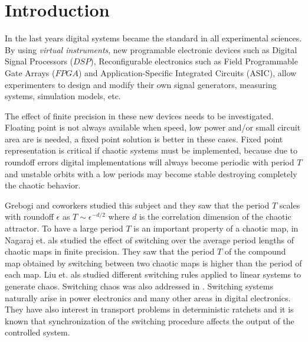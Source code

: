 \section{Introduction} \label{sec:intro}

In the last years digital systems became the standard in all experimental sciences.
By using \textit{virtual instruments}, new programable electronic devices such as Digital Signal Processors ($DSP$), Reconfigurable electronics such as Field Programmable Gate Arrays ($FPGA$) and Application-Specific Integrated Circuits (ASIC), allow experimenters to design and modify their own signal generators, measuring systems, simulation models, etc.

The effect of finite precision in these new devices needs to be investigated.
Floating point is not always available when speed, low power and/or small circuit area are is needed, a fixed point solution is better in these cases.
Fixed point representation is critical if chaotic systems must be implemented, because due to roundoff errors digital implementations will always become periodic with period $T$ and unstable orbits with a low periods may become stable destroying completely the chaotic behavior.

Grebogi and coworkers \cite{Grebogi1988} studied this subject and they saw that the period $T$ scales with roundoff $\epsilon$ as $T\sim\epsilon^{-d/2}$ where $d$ is the correlation dimension of the chaotic attractor.
To have a large period $T$ is an important property of a chaotic map, in \cite{Nagaraj2008} Nagaraj et. als studied the effect of switching over the average period lengths of chaotic maps in finite precision.
They saw that the period $T$ of the compound map obtained by switching between two chaotic maps is higher than the period of each map.
Liu et. als \cite{Liu2006} studied different switching rules applied to linear systems to generate chaos.
Switching chaos was also addressed in \cite{Gluskin2008}.
Switching systems naturally arise in power electronics and many other areas in digital electronics.
They have also interest in transport problems in deterministic ratchets \cite{Zarlenga2009} and it is known that synchronization of the switching procedure affects the output of the controlled system.

